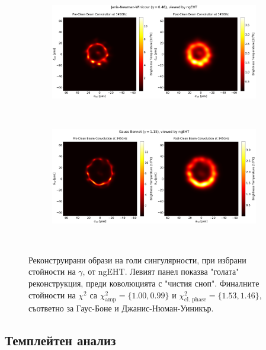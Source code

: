 \begin{figure}[h!]
	\centering
	\begin{subfigure}{12cm}
		\hspace{-1.5cm}
		\includegraphics[scale = 0.23]{Ehtim_plot_ngEHT_no_blur_345_JNW.png}
	\end{subfigure}\\
	\begin{subfigure}{12cm}
		\hspace{-1.5cm}
		\includegraphics[scale = 0.23]{Ehtim_plot_ngEHT_no_blur_345_GB.png}
	\end{subfigure}\\
	\label{Naked_Singularity_EHT_ng2017}
	\caption[Реконструирани образи на голи сингулярности, при избрани стойности на $\gamma$, от ngEHT]{\small Реконструирани образи на голи сингулярности, при избрани стойности на $\gamma$, от ngEHT. Левият панел показва "голата"$\,$ реконструкция, преди коволюцията с "чистия сноп". Финалните стойности на $\chi^2$ са $\chi^2_\text{amp} = \{1.00, 0.99\}$ и $\chi^2_\text{cl. phase} = \{1.53, 1.46\}$, съответно за Гаус-Боне и Джанис-Нюман-Уиникър.} 
\end{figure}

\subsection{Темплейтен анализ}

